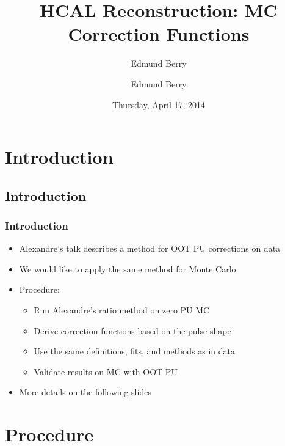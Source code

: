 \documentclass[bigger]{beamer}
\title{HCAL Reconstruction: \newline MC Correction Functions}
\author{Edmund Berry}
\date{Thursday, April 17, 2014}
\author[Edmund Berry]{\alert{Edmund Berry}}
\begin{document}
\maketitle


\section{Introduction}
\label{sec-1}
\subsection{Introduction}
\label{sec-1-1}
\begin{frame}
\frametitle{Introduction}
\label{sec-1-1-1}
\begin{itemize}

\item Alexandre's talk describes a method for OOT PU corrections on data
\label{sec-1-1-1-1}%

\item We would like to apply the same method for Monte Carlo
\label{sec-1-1-1-2}%

\item Procedure:
\label{sec-1-1-1-3}%
\begin{itemize}

\item Run Alexandre's ratio method on zero PU MC
\label{sec-1-1-1-3-1}%

\item Derive correction functions based on the pulse shape
\label{sec-1-1-1-3-2}%

\item Use the same definitions, fits, and methods as in data
\label{sec-1-1-1-3-3}%

\item Validate results on MC with OOT PU
\label{sec-1-1-1-3-4}%
\end{itemize} %

\item More details on the following slides
\label{sec-1-1-1-4}%
\end{itemize} %
\end{frame}
\section{Procedure}
\label{sec-2}
\end{document}
